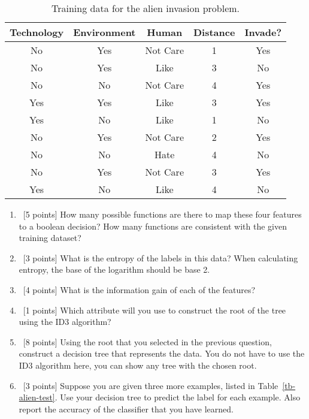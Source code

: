 \begin{enumerate}
        \begin{table}[h]
        \centering
        \begin{tabular}{cccc|c}
        \hline
        Technology & Environment & Human      & Distance & Invade? \\ \hline
        No        & Yes         & Not Care   & 1       & Yes      \\
        No        & Yes         & Like       & 3       & No       \\
        No        & No          & Not Care   & 4       & Yes      \\
        Yes       & Yes         & Like       & 3       & Yes      \\
        Yes       & No          & Like       & 1       & No       \\
        No        & Yes         & Not Care   & 2       & Yes      \\
        No        & No          & Hate       & 4       & No       \\
        No        & Yes         & Not Care   & 3       & Yes      \\
        Yes       & No          & Like       & 4       & No       \\ \hline
        \end{tabular}
        \caption{Training data for the alien invasion problem.}\label{tb-alien-train}
        \end{table}


        \begin{enumerate}
            \item~[5 points] How many possible functions are there to map these four features to a boolean decision? How many functions are consistent with the given training dataset?
            \item~[3 points] What is the entropy of the labels in this data? When calculating entropy, the base of the logarithm should be base 2.
            \item~[4 points] What is the information gain of each of the features?
            \item~[1 points] Which attribute will you use to construct the root of the tree using the ID3 algorithm?
            \item~[8 points] Using the root that you selected in the previous question, construct a decision tree that represents the data. You do not have to use the ID3 algorithm here, you can show any tree with the chosen root.
            \item~[3 points] Suppose you are given three more examples, listed in Table~\ref{tb-alien-test}. Use your decision tree to predict the label for each example. Also report the accuracy of the classifier that you have learned.
        \end{enumerate}


\end{enumerate}
